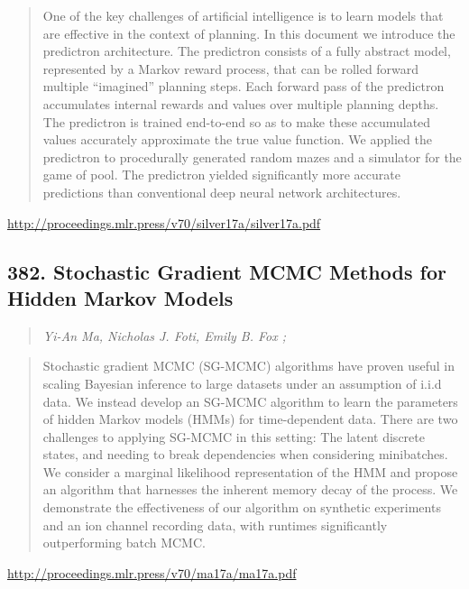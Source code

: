 \documentclass{article}
\begin{document}
\begin{quote}
    One of the key challenges of artificial intelligence is to learn models that are effective in the context of planning. In this document we introduce the predictron architecture. The predictron consists of a fully abstract model, represented by a Markov reward process, that can be rolled forward multiple “imagined” planning steps. Each forward pass of the predictron accumulates internal rewards and values over multiple planning depths. The predictron is trained end-to-end so as to make these accumulated values accurately approximate the true value function. We applied the predictron to procedurally generated random mazes and a simulator for the game of pool. The predictron yielded significantly more accurate predictions than conventional deep neural network architectures.  \end{quote}

\href{http://proceedings.mlr.press/v70/silver17a/silver17a.pdf}{http://proceedings.mlr.press/v70/silver17a/silver17a.pdf}

\subsection{382. Stochastic Gradient MCMC Methods for Hidden Markov Models}

\begin{quote}
\footnotesize{\textit{Yi-An Ma, Nicholas J. Foti, Emily B. Fox ;}}
\end{quote}

\begin{quote}
    Stochastic gradient MCMC (SG-MCMC) algorithms have proven useful in scaling Bayesian inference to large datasets under an assumption of i.i.d data. We instead develop an SG-MCMC algorithm to learn the parameters of hidden Markov models (HMMs) for time-dependent data. There are two challenges to applying SG-MCMC in this setting: The latent discrete states, and needing to break dependencies when considering minibatches. We consider a marginal likelihood representation of the HMM and propose an algorithm that harnesses the inherent memory decay of the process. We demonstrate the effectiveness of our algorithm on synthetic experiments and an ion channel recording data, with runtimes significantly outperforming batch MCMC.  \end{quote}

\href{http://proceedings.mlr.press/v70/ma17a/ma17a.pdf}{http://proceedings.mlr.press/v70/ma17a/ma17a.pdf}
\end{document}
